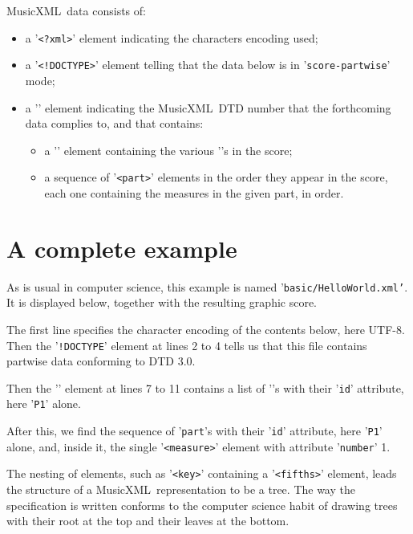 \documentclass[12pt,a4paper]{article}
\newcommand{\mxml}{MusicXML}
\begin{document}
\mxml\ data consists of:
\begin{itemize}
\item a {'\tt <?xml>}' element indicating the characters encoding used;
\item a {'\tt <!DOCTYPE>}' element telling that the data below is in {'\tt score-partwise}' mode; 
\item a {'\tt <score-partwise>}' element indicating the \mxml\ DTD number that the forthcoming data complies to, and that contains:

\begin{itemize}
\item a {'\tt <part-list>}' element containing the various {'\tt <score-part>}'s in the score;
\item a sequence of {'\tt <part>}' elements in the order they appear in the score, each one containing the measures in the given part, in order. 
\end{itemize}

\end{itemize}


\section{A complete example}

As is usual in computer science, this example is named '{\tt basic/HelloWorld.xml'}. It is displayed below, together with the resulting graphic score.

The first line specifies the character encoding of the contents below, here UTF-8. Then the '{\tt !DOCTYPE}' element at lines 2 to 4 tells us that this file contains partwise data conforming to DTD 3.0.

Then the '{\tt <part-list>}' element at lines 7 to 11 contains a list of '{\tt <score-part>}'s with their '{\tt id}' attribute, here '{\tt P1}' alone.

After this, we find the sequence of '{\tt part}'s with their '{\tt id}' attribute, here '{\tt P1}' alone, and, inside it, the single '{\tt <measure>}' element with attribute '{\tt number}' 1.

The nesting of elements, such as {'\tt <key>}' containing a {'\tt <fifths>}' element, leads the structure of a \mxml\ representation to be a tree. The way the specification is written conforms to the computer science habit of drawing trees with their root at the top and their leaves at the bottom.
\end{document}
